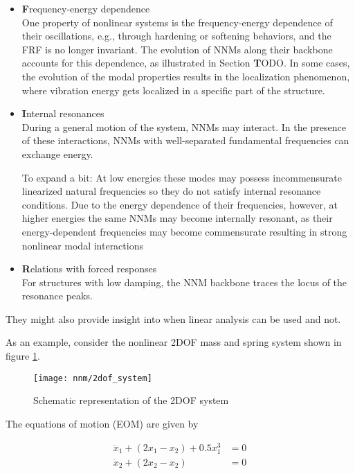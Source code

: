 \begin{itemize}
\item {\textbf Frequency-energy dependence}\\
  One property of nonlinear systems is the frequency-energy dependence of their
  oscillations, e.g., through hardening or softening behaviors, and the FRF is
  no longer invariant.
  The evolution of NNMs along their backbone accounts for this dependence, as
  illustrated in Section {\textbf TODO}. In some cases, the evolution of the modal
  properties results in the localization phenomenon, where vibration energy gets
  localized in a specific part of the structure.
\item {\textbf Internal resonances}\\
  During a general motion of the system, NNMs may interact. In the presence of
  these interactions, NNMs with well-separated fundamental frequencies can
  exchange energy.

  To expand a bit: At low energies these modes may possess incommensurate
  linearized natural frequencies so they do not satisfy internal resonance
  conditions. Due to the energy dependence of their frequencies, however, at
  higher energies the same NNMs may become internally resonant, as their
  energy-dependent frequencies may become commensurate resulting in strong
  nonlinear modal interactions
\item {\textbf Relations with forced responses}\\
  For structures with low damping, the NNM backbone traces the locus of the
  resonance peaks.
\end{itemize}

They might also provide insight into when linear analysis can be used and not.



As an example, consider the nonlinear 2DOF mass and spring system shown in
figure \ref{fig:2dof_system}.

\begin{figure}[!ht]
  \centering
  \texttt{[image: nnm/2dof\_system]}
  \caption{Schematic representation of the 2DOF system}
  \label{fig:2dof_system}
\end{figure}

The equations of motion (EOM) are given by

\begin{equation}
  \label{eq:2dof_nonlin_sys}
  \begin{aligned}
    \ddot x_1 + (2x_1 - x_2) + 0.5 x_1^3 &= 0 \\
    \ddot x_2 + (2x_2 - x_2) &= 0
  \end{aligned}
\end{equation}

